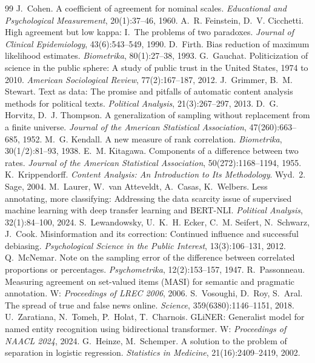 \documentclass[10pt,a4paper]{article}
\begin{document}
\begin{thebibliography}{99}
 J.~Cohen. A coefficient of agreement for nominal scales. \textit{Educational and Psychological Measurement}, 20(1):37--46, 1960.
 A.~R. Feinstein, D.~V. Cicchetti. High agreement but low kappa: I.~The problems of two paradoxes. \textit{Journal of Clinical Epidemiology}, 43(6):543--549, 1990.
 D.~Firth. Bias reduction of maximum likelihood estimates. \textit{Biometrika}, 80(1):27--38, 1993.
 G.~Gauchat. Politicization of science in the public sphere: A study of public trust in the United States, 1974 to 2010. \textit{American Sociological Review}, 77(2):167--187, 2012.
 J.~Grimmer, B.~M. Stewart. Text as data: The promise and pitfalls of automatic content analysis methods for political texts. \textit{Political Analysis}, 21(3):267--297, 2013.
 D.~G. Horvitz, D.~J. Thompson. A generalization of sampling without replacement from a finite universe. \textit{Journal of the American Statistical Association}, 47(260):663--685, 1952.
 M.~G. Kendall. A new measure of rank correlation. \textit{Biometrika}, 30(1/2):81--93, 1938.
 E.~M. Kitagawa. Components of a difference between two rates. \textit{Journal of the American Statistical Association}, 50(272):1168--1194, 1955.
 K.~Krippendorff. \textit{Content Analysis: An Introduction to Its Methodology}. Wyd.~2. Sage, 2004.
 M.~Laurer, W.~van Atteveldt, A.~Casas, K.~Welbers. Less annotating, more classifying: Addressing the data scarcity issue of supervised machine learning with deep transfer learning and BERT-NLI. \textit{Political Analysis}, 32(1):84--100, 2024.
 S.~Lewandowsky, U.~K.~H. Ecker, C.~M. Seifert, N.~Schwarz, J.~Cook. Misinformation and its correction: Continued influence and successful debiasing. \textit{Psychological Science in the Public Interest}, 13(3):106--131, 2012.
 Q.~McNemar. Note on the sampling error of the difference between correlated proportions or percentages. \textit{Psychometrika}, 12(2):153--157, 1947.
 R.~Passonneau. Measuring agreement on set-valued items (MASI) for semantic and pragmatic annotation. W: \textit{Proceedings of LREC 2006}, 2006.
 S.~Vosoughi, D.~Roy, S.~Aral. The spread of true and false news online. \textit{Science}, 359(6380):1146--1151, 2018.
 U.~Zaratiana, N.~Tomeh, P.~Holat, T.~Charnois. GLiNER: Generalist model for named entity recognition using bidirectional transformer. W: \textit{Proceedings of NAACL 2024}, 2024.
 G.~Heinze, M.~Schemper. A solution to the problem of separation in logistic regression. \textit{Statistics in Medicine}, 21(16):2409--2419, 2002.

\end{thebibliography}
\end{document}
